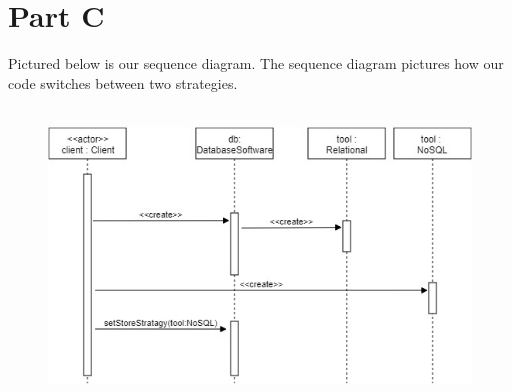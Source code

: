 \documentclass{article}
\begin{document}
\newpage

\section*{Part C}

Pictured below is our sequence diagram. The sequence diagram pictures how our code switches between two strategies. \\\\ 
\begin{figure}[h]
	\centering
	\includegraphics[scale=0.5]{sequence-diagram.jpg}
\end{figure}
	
\end{document}
